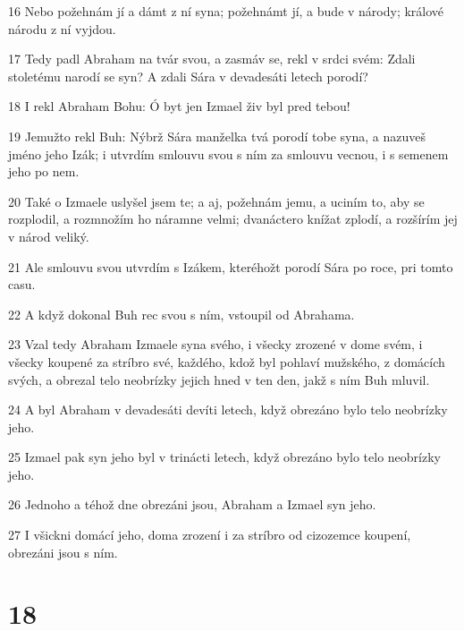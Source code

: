 \par 16 Nebo požehnám jí a dámt z ní syna; požehnámt jí, a bude v národy; králové národu z ní vyjdou.
\par 17 Tedy padl Abraham na tvár svou, a zasmáv se, rekl v srdci svém: Zdali stoletému narodí se syn? A zdali Sára v devadesáti letech porodí?
\par 18 I rekl Abraham Bohu: Ó byt jen Izmael živ byl pred tebou!
\par 19 Jemužto rekl Buh: Nýbrž Sára manželka tvá porodí tobe syna, a nazuveš jméno jeho Izák; i utvrdím smlouvu svou s ním za smlouvu vecnou, i s semenem jeho po nem.
\par 20 Také o Izmaele uslyšel jsem te; a aj, požehnám jemu, a uciním to, aby se rozplodil, a rozmnožím ho náramne velmi; dvanáctero knížat zplodí, a rozšírím jej v národ veliký.
\par 21 Ale smlouvu svou utvrdím s Izákem, kteréhožt porodí Sára po roce, pri tomto casu.
\par 22 A když dokonal Buh rec svou s ním, vstoupil od Abrahama.
\par 23 Vzal tedy Abraham Izmaele syna svého, i všecky zrozené v dome svém, i všecky koupené za stríbro své, každého, kdož byl pohlaví mužského, z domácích svých, a obrezal telo neobrízky jejich hned v ten den, jakž s ním Buh mluvil.
\par 24 A byl Abraham v devadesáti devíti letech, když obrezáno bylo telo neobrízky jeho.
\par 25 Izmael pak syn jeho byl v trinácti letech, když obrezáno bylo telo neobrízky jeho.
\par 26 Jednoho a téhož dne obrezáni jsou, Abraham a Izmael syn jeho.
\par 27 I všickni domácí jeho, doma zrození i za stríbro od cizozemce koupení, obrezáni jsou s ním.

\chapter{18}

